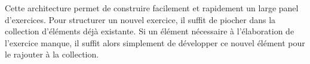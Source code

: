 Cette architecture permet de construire facilement et rapidement un large panel d'exercices. Pour structurer un nouvel exercice, il suffit de piocher dans la collection d'éléments déjà existante. Si un élément nécessaire à l'élaboration de l'exercice manque, il suffit alors simplement de développer ce nouvel élément pour le rajouter à la collection.






